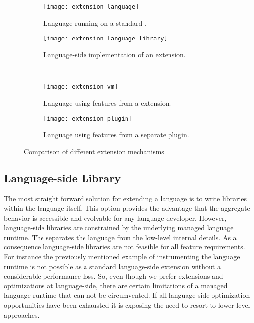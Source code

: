 \begin{figure}[h]
	\centering
	\begin{subfigure}[t]{0.45\textwidth}
		\centering
		\texttt{[image: extension-language]}
		\caption{Language running on a standard \VM.}
	\end{subfigure}\hspace{0.09\textwidth}
	\begin{subfigure}[t]{0.45\textwidth}
		\centering
		\texttt{[image: extension-language-library]}
		\caption{Language-side implementation of an extension.}
	\end{subfigure} \\
	\vspace{\baselineskip}
	\begin{subfigure}[b]{0.45\textwidth}
		\centering
		\texttt{[image: extension-vm]}
		\caption{Language using features from a \VM extension.}
	\end{subfigure}\hspace{0.09\textwidth}
	\begin{subfigure}[b]{0.45\textwidth}
		\centering
		\texttt{[image: extension-plugin]}
		\caption{Language using features from a separate \VM plugin.}
	\end{subfigure}
	
	\caption[Language Extension Mechanisms]{Comparison of different extension mechanisms}
\end{figure}

\subsection{Language-side Library}

The most straight forward solution for extending a language is to write libraries within the language itself. 
This option provides the advantage that the aggregate behavior is accessible and evolvable for any language developer.
However, language-side libraries are constrained by the underlying managed language runtime.
The \VM separates the language from the low-level internal details.
As a consequence language-side libraries are not feasible for all feature requirements.
For instance the previously mentioned example of instrumenting the language runtime is not possible as a standard language-side extension without a considerable performance loss.
So, even though we prefer extensions and optimizations at language-side, there are certain limitations of a managed language runtime that can not be circumvented.
If all language-side optimization opportunities have been exhausted it is exposing the need to resort to lower level approaches.

